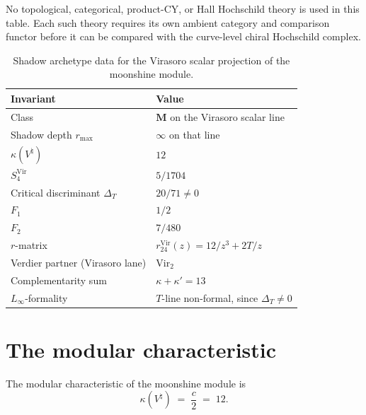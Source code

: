 No topological, categorical, product-CY, or Hall Hochschild theory is
used in this table. Each such theory requires its own ambient category
and comparison functor before it can be compared with the curve-level
chiral Hochschild complex.

\begin{table}[ht]
\centering
\small
\caption{Shadow archetype data for the Virasoro scalar projection of
the moonshine module.}\label{tab:moonshine-shadow-archetype}
\begin{tabular}{ll}
\toprule
\textbf{Invariant} & \textbf{Value} \\
\midrule
Class & $\mathbf{M}$ on the Virasoro scalar line \\
Shadow depth $r_{\max}$ & $\infty$ on that line \\
$\kappa(V^\natural)$ & $12$ \\
$S_4^{\mathrm{Vir}}$ & $5/1704$ \\
Critical discriminant $\Delta_T$ & $20/71 \neq 0$ \\
$F_1$ & $1/2$ \\
$F_2$ & $7/480$ \\
$r$-matrix & $r^{\mathrm{Vir}}_{24}(z)=12/z^3+2T/z$ \\
Verdier partner (Virasoro lane) & $\mathrm{Vir}_2$ \\
Complementarity sum & $\kappa+\kappa'=13$ \\
$L_\infty$-formality & $T$-line non-formal, since $\Delta_T \neq 0$ \\
\bottomrule
\end{tabular}
\end{table}

\section{The modular characteristic}

\begin{proposition}[$\kappa(V^\natural) = 12$;
\ClaimStatusConditional]\label{prop:moonshine-kappa}%
%
The modular characteristic of the moonshine module is
\[
\kappa(V^\natural) \;=\; \frac{c}{2} \;=\; 12.
\]
\end{proposition}

